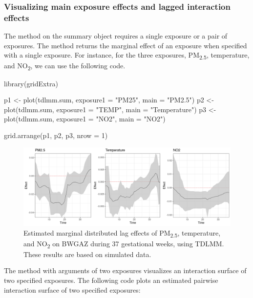 \subsubsection{Visualizing main exposure effects and lagged interaction effects}
The  method on the summary object  requires a single exposure or a pair of exposures. The  method returns the marginal effect of an exposure when specified with a single exposure. For instance, for the three exposures, PM\textsubscript{2.5}, temperature, and NO\textsubscript{2}, we can use the following code.

\begin{example}
library(gridExtra)

p1 <- plot(tdlmm.sum, exposure1 = "PM25", main = "PM2.5")
p2 <- plot(tdlmm.sum, exposure1 = "TEMP", main = "Temperature")
p3 <- plot(tdlmm.sum, exposure1 = "NO2", main = "NO2")

grid.arrange(p1, p2, p3, nrow = 1)
\end{example}
\begin{figure}[ht]
    \centering
    \includegraphics[width=140mm]{images/TDLMM_main.png}
    \caption{Estimated marginal distributed lag effects of PM\textsubscript{2.5}, temperature, and NO\textsubscript{2} on BWGAZ during 37 gestational weeks, using TDLMM. These results are based on simulated data.}
    \label{fig:tdlmm_main}
\end{figure}
The  method with arguments of two exposures visualizes an interaction surface of two specified exposures. The following code plots an estimated pairwise interaction surface of two specified exposures:

